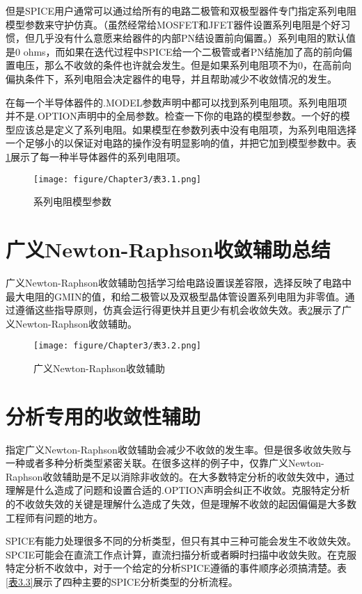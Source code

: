 但是SPICE用户通常可以通过给所有的电路二极管和双极型器件专门指定系列电阻模型参数来守护仿真。（虽然经常给MOSFET和JFET器件设置系列电阻是个好习惯，但几乎没有什么意愿来给器件的内部PN结设置前向偏置。）系列电阻的默认值是0 ohms，而如果在迭代过程中SPICE给一个二极管或者PN结施加了高的前向偏置电压，那么不收敛的条件也许就会发生。但是如果系列电阻项不为0，在高前向偏执条件下，系列电阻会决定器件的电导，并且帮助减少不收敛情况的发生。

在每一个半导体器件的.MODEL参数声明中都可以找到系列电阻项。系列电阻项并不是.OPTION声明中的全局参数。检查一下你的电路的模型参数。一个好的模型应该总是定义了系列电阻。如果模型在参数列表中没有电阻项，为系列电阻选择一个足够小的以保证对电路的操作没有明显影响的值，并把它加到模型参数中。表\ref{表3.1}展示了每一种半导体器件的系列电阻项。

\begin{figure}[htbp]
\small
    \centering
    \texttt{[image: figure/Chapter3/表3.1.png]}
    \caption{系列电阻模型参数}
    \label{表3.1}
\end{figure}

\section{广义Newton-Raphson收敛辅助总结}
广义Newton-Raphson收敛辅助包括学习给电路设置误差容限，选择反映了电路中最大电阻的GMIN的值，和给二极管以及双极型晶体管设置系列电阻为非零值。通过遵循这些指导原则，仿真会运行得更快并且更少有机会收敛失效。表\ref{表3.2}展示了广义Newton-Raphson收敛辅助。
\begin{figure}[htbp]
\small
    \centering
    \texttt{[image: figure/Chapter3/表3.2.png]}
    \caption{广义Newton-Raphson收敛辅助}
    \label{表3.2}
\end{figure}

\section{分析专用的收敛性辅助}
指定广义Newton-Raphson收敛辅助会减少不收敛的发生率。但是很多收敛失败与一种或者多种分析类型紧密关联。在很多这样的例子中，仅靠广义Newton-Raphson收敛辅助是不足以消除非收敛的。在大多数特定分析的收敛失效中，通过理解是什么造成了问题和设置合适的.OPTION声明会纠正不收敛。克服特定分析的不收敛失效的关键是理解什么造成了失效，但是理解不收敛的起因偏偏是大多数工程师有问题的地方。

SPICE有能力处理很多不同的分析类型，但只有其中三种可能会发生不收敛失效。SPCIE可能会在直流工作点计算，直流扫描分析或者瞬时扫描中收敛失败。在克服特定分析不收敛中，对于一个给定的分析SPICE遵循的事件顺序必须搞清楚。表\ref{表3.3}展示了四种主要的SPICE分析类型的分析流程。

